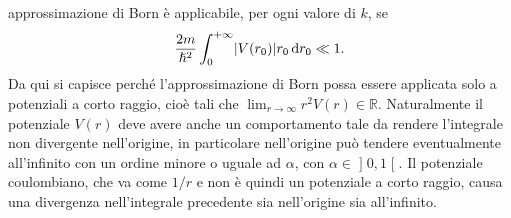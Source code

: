 \documentclass[a4paper,fleqn,twoside,12pt]{article}
\newcommand*{\dd}{\mathop{}\!\mathrm{d}} %
\DeclarePairedDelimiter{\abs}{\lvert}{\rvert}
\begin{document}
approssimazione di Born è applicabile, per ogni valore di $k$, se
\begin{equation}
  \frac{2m}{\hslash^{2}}\int_{0}^{+\infty}\abs{V(r_{0})}r_{0}\dd r_{0} \ll 1.
\end{equation}
Da qui si capisce perché l'approssimazione di Born possa essere applicata solo a
potenziali a corto raggio, cioè tali che
$\lim_{r \to \infty}r^{2}V(r) \in \mathbb{R}$.  Naturalmente il potenziale
$V(r)$ deve avere anche un comportamento tale da rendere l'integrale non
divergente nell'origine, in particolare nell'origine può tendere eventualmente
all'infinito con un ordine minore o uguale ad $\alpha$, con
$\alpha \in \mathopen{]}0, 1\mathclose{[}$.  Il potenziale coulombiano, che va
come $1/r$ e non è quindi un potenziale a corto raggio, causa una divergenza
nell'integrale precedente sia nell'origine sia all'infinito.
\end{document}
